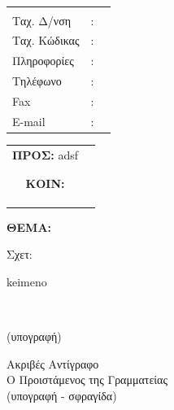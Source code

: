 \documentclass[12pt]{article}
\begin{document}
\\
\noindent
\begin{minipage}{.6\textwidth}
	\begin{tabular}{lll}
		&  &  \\ 
		Tαχ. Δ/νση & : &   \\
		Ταχ. Κώδικας & : &   \\
		Πληροφορίες & : &   \\
		Τηλέφωνο & : &   \\
		Fax & : &   \\
		E-mail & : &   \\
	\end{tabular} 
\end{minipage}
\begin{minipage}{.4\textwidth}
	\begin{tabular}{cc}
		\textbf{ΠΡΟΣ:} adsf &  \\ 
		&  \\ 
		&  \\ 
		\textbf{ΚΟΙΝ:} &  \\ 
		&  \\ 
		&  \\ 
		&  \\ 
	\end{tabular} 
\end{minipage}
\vspace{2cm}
\begin{flushleft}
	\textbf{ΘΕΜΑ:}
\end{flushleft}
\begin{flushleft}
	Σχετ:
\end{flushleft}
\vspace{1cm}
\begin{minipage}{\textwidth}
	keimeno
\end{minipage}
\\
\vspace{.5cm}
\begin{flushright}
	(υπογραφή)
\end{flushright}

\begin{minipage}{.4\textwidth}
\begin{center}
	Aκριβές Αντίγραφο\\
	Ο Προιστάμενος της Γραμματείας\\
	\vspace{0.5cm}
	(υπογραφή - σφραγίδα)
\end{center}
\end{minipage}
\end{document}
